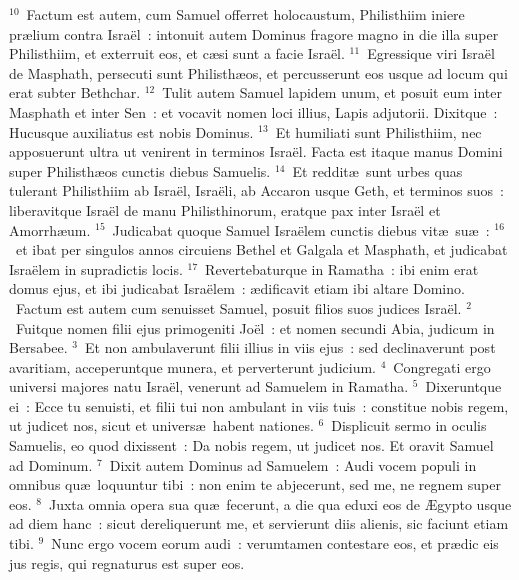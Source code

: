 ${}^{10}$~Factum est autem, cum Samuel offerret holocaustum, Philisthiim iniere pr\ae lium contra Isra\"el~: intonuit autem Dominus fragore magno in die illa super Philisthiim, et exterruit eos, et c\ae si sunt a facie Isra\"el.
${}^{11}$~Egressique viri Isra\"el de Masphath, persecuti sunt Philisth\ae os, et percusserunt eos usque ad locum qui erat subter Bethchar.
${}^{12}$~Tulit autem Samuel lapidem unum, et posuit eum inter Masphath et inter Sen~: et vocavit nomen loci illius, Lapis adjutorii. Dixitque~: Hucusque auxiliatus est nobis Dominus.
${}^{13}$~Et humiliati sunt Philisthiim, nec apposuerunt ultra ut venirent in terminos Isra\"el. Facta est itaque manus Domini super Philisth\ae os cunctis diebus Samuelis.
${}^{14}$~Et reddit\ae\ sunt urbes quas tulerant Philisthiim ab Isra\"el, Isra\"eli, ab Accaron usque Geth, et terminos suos~: liberavitque Isra\"el de manu Philisthinorum, eratque pax inter Isra\"el et Amorrh\ae um.
${}^{15}$~Judicabat quoque Samuel Isra\"elem cunctis diebus vit\ae\ su\ae~:
${}^{16}$~et ibat per singulos annos circuiens Bethel et Galgala et Masphath, et judicabat Isra\"elem in supradictis locis.
${}^{17}$~Revertebaturque in Ramatha~: ibi enim erat domus ejus, et ibi judicabat Isra\"elem~: \ae dificavit etiam ibi altare Domino.
~Factum est autem cum senuisset Samuel, posuit filios suos judices Isra\"el.
${}^{2}$~Fuitque nomen filii ejus primogeniti Jo\"el~: et nomen secundi Abia, judicum in Bersabee.
${}^{3}$~Et non ambulaverunt filii illius in viis ejus~: sed declinaverunt post avaritiam, acceperuntque munera, et perverterunt judicium.
${}^{4}$~Congregati ergo universi majores natu Isra\"el, venerunt ad Samuelem in Ramatha.
${}^{5}$~Dixeruntque ei~: Ecce tu senuisti, et filii tui non ambulant in viis tuis~: constitue nobis regem, ut judicet nos, sicut et univers\ae\ habent nationes.
${}^{6}$~Displicuit sermo in oculis Samuelis, eo quod dixissent~: Da nobis regem, ut judicet nos. Et oravit Samuel ad Dominum.
${}^{7}$~Dixit autem Dominus ad Samuelem~: Audi vocem populi in omnibus qu\ae\ loquuntur tibi~: non enim te abjecerunt, sed me, ne regnem super eos.
${}^{8}$~Juxta omnia opera sua qu\ae\ fecerunt, a die qua eduxi eos de \AE gypto usque ad diem hanc~: sicut dereliquerunt me, et servierunt diis alienis, sic faciunt etiam tibi.
${}^{9}$~Nunc ergo vocem eorum audi~: verumtamen contestare eos, et pr\ae dic eis jus regis, qui regnaturus est super eos.


